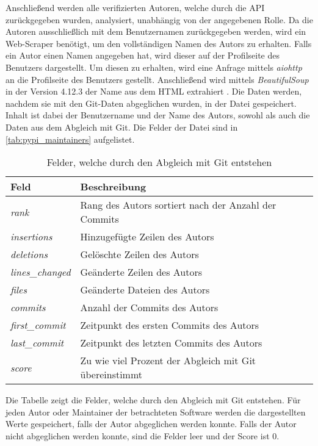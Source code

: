 Anschließend werden alle verifizierten Autoren, welche durch die API zurückgegeben wurden, analysiert, unabhängig von der angegebenen Rolle.
Da die Autoren ausschließlich mit dem Benutzernamen zurückgegeben werden, wird ein Web-Scraper benötigt, um den vollständigen Namen des Autors zu erhalten.
Falls ein Autor einen Namen angegeben hat, wird dieser auf der Profilseite des Benutzers dargestellt.
Um diesen zu erhalten, wird eine Anfrage mittels \emph{aiohttp} an die Profilseite des Benutzers gestellt.
Anschließend wird mittels \emph{BeautifulSoup} in der Version 4.12.3 der Name aus dem HTML extrahiert \autocite{richardson_beautifulsoup4_2024}.
Die Daten werden, nachdem sie mit den Git-Daten abgeglichen wurden, in der Datei  gespeichert.
Inhalt ist dabei der Benutzername und der Name des Autors, sowohl als auch die Daten aus dem Abgleich mit Git.
Die Felder der Datei sind in \autoref{tab:pypi_maintainers} aufgelistet.

\begin{table}
    \begin{tabularx}{\textwidth}{XL{10.2cm}}
        \toprule
        \textbf{Feld}         & \textbf{Beschreibung} \\ \midrule
        \emph{rank}           & Rang des Autors sortiert nach der Anzahl der Commits   \\
        \emph{insertions}     & Hinzugefügte Zeilen des Autors                         \\
        \emph{deletions}      & Gelöschte Zeilen des Autors                            \\
        \emph{lines\_changed} & Geänderte Zeilen des Autors                            \\
        \emph{files}          & Geänderte Dateien des Autors                           \\
        \emph{commits}        & Anzahl der Commits des Autors                          \\
        \emph{first\_commit}  & Zeitpunkt des ersten Commits des Autors                \\
        \emph{last\_commit}   & Zeitpunkt des letzten Commits des Autors               \\
        \emph{score}          & Zu wie viel Prozent der Abgleich mit Git übereinstimmt \\
        \bottomrule
    \end{tabularx}
    \caption{Felder, welche durch den Abgleich mit Git entstehen}
    \label{tab:abgleich_felder}
    \small
    Die Tabelle zeigt die Felder, welche durch den Abgleich mit Git entstehen. Für jeden Autor oder Maintainer der betrachteten Software werden die dargestellten Werte gespeichert, falls der Autor abgeglichen werden konnte. Falls der Autor nicht abgeglichen werden konnte, sind die Felder leer und der Score ist 0.
\end{table}


